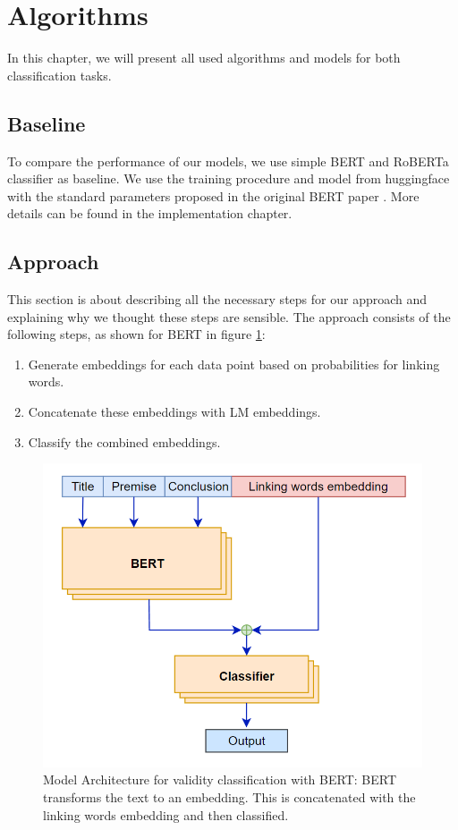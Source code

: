 \section{Algorithms}
In this chapter, we will present all used algorithms and models for both classification tasks.

\subsection{Baseline}
To compare the performance of our models, we use simple BERT and RoBERTa classifier \cite{bert, roberta} as baseline. We use the training procedure and model from huggingface \cite{berttraining} with the standard parameters proposed in the original BERT paper \cite{bert}. More details can be found in the implementation chapter.

\subsection{Approach}

This section is about describing all the necessary steps for our approach and explaining why we thought these steps are sensible. The approach consists of the following steps, as shown for BERT in figure \ref{fig:model-architecture1}:

\begin{enumerate}
	\item Generate embeddings for each data point based on probabilities for linking words.
	\item Concatenate these embeddings with LM embeddings.
	\item Classify the combined embeddings.
\end{enumerate}

\begin{figure}[h]
  \centering
  \includegraphics[scale=0.6]{fig/model_diag1.png}
  \caption{Model Architecture for validity classification with BERT: BERT transforms the text to an embedding. This is concatenated with the linking words embedding and then classified.}%
  \label{fig:model-architecture1}
\end{figure}

